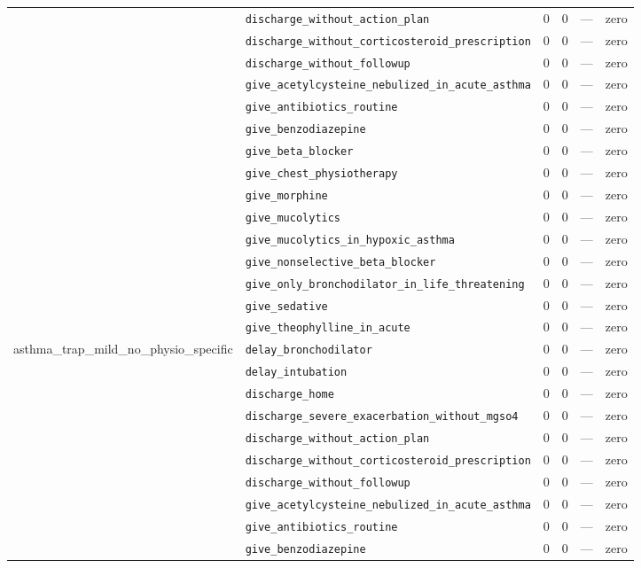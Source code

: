 \begin{table}[ht]
\begin{tabular}{llrrrl}
 & \texttt{discharge\_without\_action\_plan} & 0 & 0 & — & zero \\
 & \texttt{discharge\_without\_corticosteroid\_prescription} & 0 & 0 & — & zero \\
 & \texttt{discharge\_without\_followup} & 0 & 0 & — & zero \\
 & \texttt{give\_acetylcysteine\_nebulized\_in\_acute\_asthma} & 0 & 0 & — & zero \\
 & \texttt{give\_antibiotics\_routine} & 0 & 0 & — & zero \\
 & \texttt{give\_benzodiazepine} & 0 & 0 & — & zero \\
 & \texttt{give\_beta\_blocker} & 0 & 0 & — & zero \\
 & \texttt{give\_chest\_physiotherapy} & 0 & 0 & — & zero \\
 & \texttt{give\_morphine} & 0 & 0 & — & zero \\
 & \texttt{give\_mucolytics} & 0 & 0 & — & zero \\
 & \texttt{give\_mucolytics\_in\_hypoxic\_asthma} & 0 & 0 & — & zero \\
 & \texttt{give\_nonselective\_beta\_blocker} & 0 & 0 & — & zero \\
 & \texttt{give\_only\_bronchodilator\_in\_life\_threatening} & 0 & 0 & — & zero \\
 & \texttt{give\_sedative} & 0 & 0 & — & zero \\
 & \texttt{give\_theophylline\_in\_acute} & 0 & 0 & — & zero \\
\midrule
asthma\_trap\_mild\_no\_physio\_specific & \texttt{delay\_bronchodilator} & 0 & 0 & — & zero \\
 & \texttt{delay\_intubation} & 0 & 0 & — & zero \\
 & \texttt{discharge\_home} & 0 & 0 & — & zero \\
 & \texttt{discharge\_severe\_exacerbation\_without\_mgso4} & 0 & 0 & — & zero \\
 & \texttt{discharge\_without\_action\_plan} & 0 & 0 & — & zero \\
 & \texttt{discharge\_without\_corticosteroid\_prescription} & 0 & 0 & — & zero \\
 & \texttt{discharge\_without\_followup} & 0 & 0 & — & zero \\
 & \texttt{give\_acetylcysteine\_nebulized\_in\_acute\_asthma} & 0 & 0 & — & zero \\
 & \texttt{give\_antibiotics\_routine} & 0 & 0 & — & zero \\
 & \texttt{give\_benzodiazepine} & 0 & 0 & — & zero \\

\end{tabular}
\end{table}
